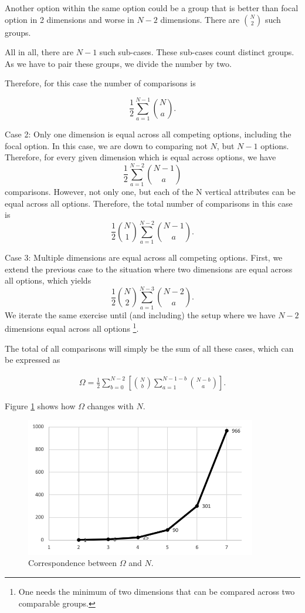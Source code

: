 \documentclass[a4paper,12pt]{article}
\begin{document}
Another option within the same option could be a group that is better than focal option in 2 dimensions and worse in $N-2$ dimensions. There are $\binom{N}{2}$ such groups. 

All in all, there are $N-1$ such sub-cases. These sub-cases count distinct groups. As we have to pair these groups, we divide the number by two.

Therefore, for this case the number of comparisons is 

$$\frac{1}{2}\sum_{a=1}^{N-1}\binom{N}{a}.$$

Case 2: Only one dimension is equal across all competing options, including the focal option. In this case, we are down to comparing not $N$, but $N-1$ options. Therefore, for every given dimension which is equal across options, we have $$\frac{1}{2}\sum_{a=1}^{N-2}\binom{N-1}{a}$$ comparisons. However, not only one, but each of the N vertical attributes can be equal across all options. Therefore, the total number of comparisons in this case is $$\frac{1}{2}\binom{N}{1}\sum_{a=1}^{N-2}{\binom{N-1}{a}.}$$

Case 3: Multiple dimensions are equal across all competing options. First, we extend the previous case to the situation where two dimensions are equal across all options, which yields $$\frac{1}{2}\binom{N}{2}\sum_{a=1}^{N-3}{\binom{N-2}{a}}.$$ We iterate the same exercise until (and including) the setup where we have $N-2$ dimensions equal across all options \footnote{One needs the minimum of two dimensions that can be compared across two comparable groups.}. 

The total of all comparisons will simply be the sum of all these cases, which can be expressed as

\begin{align}\label{eq:compromiseEffectDetailedCalculation}
    \Omega=\frac{1}{2}\sum_{b=0}^{N-2}\left[\binom{N}{b}\sum_{a=1}^{N-1-b}\binom{N-b}{a}\right].    
\end{align}


Figure \ref{fig:compromiseComparisonPlot} shows how $\Omega$ changes with $N$.

\begin{figure}[H]
    \centering
    \includegraphics[width=0.9\textwidth]{staticFiles/compromiseComparisonsZakAppendix.png}
    \caption{Correspondence between $\Omega$ and $N$.}
    \label{fig:compromiseComparisonPlot}
\end{figure}
\end{document}
